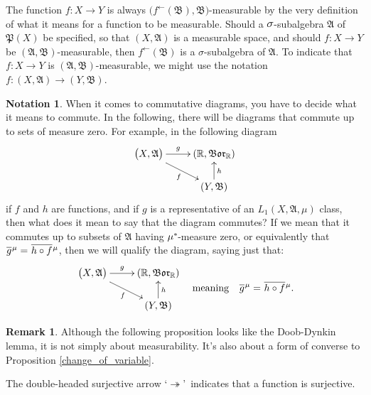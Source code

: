 \documentclass[
twoside=true,
paper=letter,
fontsize=11pt,
pagesize=auto,
leqno,
openany,
headsepline,
overfullrule,
]{scrbook}
\theoremstyle{plain}
\theoremstyle{plain}
\theoremstyle{definition}
\newtheorem{rmk}[thm]{Remark}
\newtheorem{notn}[thm]{Notation}
\theoremstyle{bfnoteitalic}
\theoremstyle{bfnoteroman}
\newcommand{\sigalg}[1]{\mathfrak{#1}}
\newcommand{\borel}{\mathfrak{Bor}}
\newcommand{\textsigma}{\hbox{\large{$\sigma$}}\kern-1pt}
\newcommand{\preimage}[1]{#1^{\leftarrow}}
\newcommand{\R}{\mathbb{R}}
\newcommand{\sigmaalgebra}{\sigalg{A}}
\newcommand{\sigmaalgebraii}{\sigalg{B}}
\newcommand{\powerset}{\mathfrak{P}}
\newcommand{\kernast}{\ast\kern-1pt}
\newcommand{\Pstar}{\measure^\kernast}
\newcommand{\Lone}{L_1(\measurespace, \sigmaalgebra, \measure)}
\newcommand{\measurespace}{X}
\newcommand{\measurespaceii}{Y}
\newcommand{\measure}{\mu}
\newcommand*\xbar[1]{%
   \hbox{%
     \vbox{%
       \hrule height 0.4pt %
       \kern0.4ex%
       \hbox{%
         \ensuremath{#1}%
       }%
     }%
   }%
}
\newcommand{\lebclass}[1]{\hspace{.5pt}\xbar{#1}\hspace{0.5pt}}
\newcommand{\ellclass}[2]{\lebclass{#1}^{#2}}
\begin{document}
The function $f: \measurespace\to\measurespaceii$ is always
$\bigl(\preimage{f}(\sigmaalgebraii), \sigmaalgebraii\bigr)$\hyp{}measurable by the very definition of what it means for a function to be measurable.
Should a $\textsigma$-subalgebra $\sigmaalgebra$ of $\powerset(\measurespace)$ be specified, so that $(\measurespace, \sigmaalgebra)$ is a measurable space, and should $f:\measurespace\to\measurespaceii$ be 
$(\sigmaalgebra, \sigmaalgebraii)$\hyp{}measurable, then $\preimage{f}(\sigmaalgebraii)$ is a \textsigma-subalgebra of $\sigmaalgebra$. 
To indicate that $f:\measurespace\to\measurespaceii$ is 
$(\sigmaalgebra, \sigmaalgebraii)$\hyp{}measurable, we might use the notation $f:(\measurespace,\sigmaalgebra)\to(\measurespaceii,\sigmaalgebraii)$.



\begin{notn}
When it comes to commutative diagrams, you have to decide what it means to commute.  In the following, there will be diagrams that commute up to sets of measure zero.  For example, in the following diagram
\[
\xymatrix@R=16pt{ 
\bigl( \measurespace, \sigmaalgebra \bigr) \ar[r]^-{g} 
\ar[dr]_{f}
&
(\R,\borel_\R)  
\\
&
(\measurespaceii, \sigmaalgebraii) \ar[u]_{h}
\\
}
\]
if $f$ and $h$ are functions, and if $g$ is a representative of an 
$\Lone$ class, then what does it mean to say that the diagram commutes? If we mean that it commutes up to subsets of $\sigmaalgebra$ having $\Pstar$-measure zero, or equivalently that 
$\ellclass{g}{\measure}=\ellclass{h\circ f}{\measure}$, then we will qualify the diagram, saying just that:
\[
\begin{gathered}
\xymatrix@R=16pt{ 
\bigl( \measurespace, \sigmaalgebra \bigr) \ar[r]^-{g} 
\ar[dr]_{f}
&
(\R,\borel_\R)  
\\
&
(\measurespaceii, \sigmaalgebraii) \ar[u]_{h}
\\
}
\end{gathered}
\quad
\text{meaning}
\quad
\ellclass{g}{\measure}=\ellclass{h\circ f}{\measure}.
\]
\end{notn}


\begin{rmk}
Although the following proposition looks like the Doob-Dynkin lemma, it is not simply about measurability. It's also about a form of converse to Proposition \ref{change_of_variable}.

The double-headed surjective arrow \lq$\twoheadrightarrow$\rq\ indicates that a function is surjective.
\end{rmk}
\end{document}
